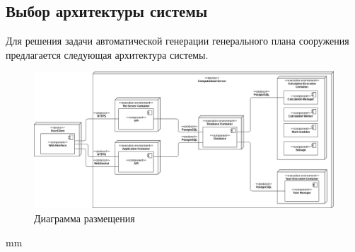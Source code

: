 \subsection*{\large{Выбор архитектуры системы}}

Для решения задачи автоматической генерации генерального плана сооружения предлагается следующая архитектура системы.

\begin{figure}[H]
	\hspace*{-2.5 cm}\includegraphics[width=1.2\textwidth, left]{images/architecture/1}
	\caption{Диаграмма размещения}
	\label{pic:architecture__deployment-diagram}
\end{figure}
 mm

